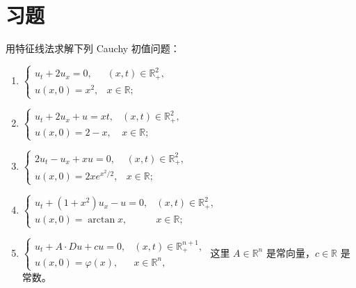 \documentclass[../../main.tex]{subfiles}%
\begin{document}
\section{习题}

\begin{example}
用特征线法求解下列 Cauchy 初值问题：
\begin{enumerate}[(1)]
\item $\begin{cases}
u_t+2u_x=0, & (x,t)\in\mathbb{R}_+^2, \\
u(x,0)=x^2, & x\in\mathbb{R};
\end{cases}$
\item $\begin{cases}
u_t+2u_x+u=xt, & (x,t)\in\mathbb{R}_+^2, \\
u(x,0)=2-x, & x\in\mathbb{R};
\end{cases}$
\item $\begin{cases}
2u_t-u_x+xu=0, & (x,t)\in\mathbb{R}_+^2, \\
u(x,0)=2xe^{x^2/2}, & x\in\mathbb{R};
\end{cases}$
\item $\begin{cases}
u_t+(1+x^2)u_x-u=0, & (x,t)\in\mathbb{R}_+^2, \\
u(x,0)=\arctan x, & x\in\mathbb{R};
\end{cases}$
\item $\begin{cases}
u_t+A\cdot Du+cu=0, & (x,t)\in\mathbb{R}_+^{n+1}, \\
u(x,0)=\varphi(x), & x\in\mathbb{R}^n,
\end{cases}$
这里 $A\in\mathbb{R}^n$ 是常向量，$c\in\mathbb{R}$ 是常数。
\end{enumerate}
\end{example}
\end{document}
